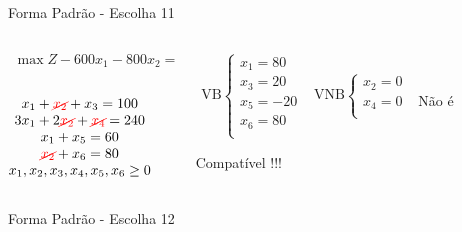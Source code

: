 \begin{frame}
{\begin{block}{Forma Padrão - {\color{cyan}Escolha 11}}
			\begin{columns}
				\begin{column}{0.35\textwidth}
					$
						\begin{matrix}
							\max Z - 600x_1 - 800x_2 = 0 \\
						\end{matrix}
					$ \\
					 \\
					$
						\begin{matrix}
							x_1  + {\color{red}\cancel{x_2}}  + x_3                   = 100 \\
							3x_1 + 2{\color{red}\cancel{x_2}}       + {\color{red}\cancel{x_4}}             = 240 \\
							x_1                     + x_5       = 60 \\
							{\color{red}\cancel{x_2}}                           + x_6 = 80 \\
							x_1,x_2, x_3, x_4, x_5, x_6 \ge 0 \\
						\end{matrix}
					$
				\end{column}
				\vline
				\hspace{0.1cm}
				\begin{column}{0.45\textwidth}
						$
							\begin{matrix}
								\text{VB} \left\{  \begin{matrix}
																 x_1 = 80 \\
																 x_3 = 20 \\
																 x_5 = -20 \\
																 x_6 = 80 \\
												   \end{matrix} 
										   \right.
								&
								\text{VNB} \left\{  \begin{matrix}
																 x_2 = 0 \\
																 x_4 = 0 \\
												   \end{matrix} 
										   \right. 
								\\
							 & \\
							\end{matrix}
						$
						{\color{red}Não é Compatível !!!}
				\end{column}
			\end{columns}
		\end{block}
	}
	{
		\begin{block}{Forma Padrão - {\color{cyan}Escolha 12}}

\end{block}}
\end{frame}
